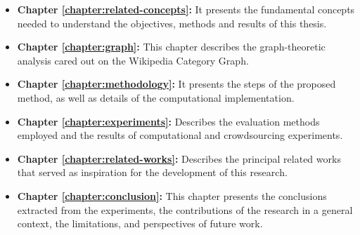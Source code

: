 \begin{itemize}
\item\textbf {Chapter \ref{chapter:related-concepts}:} It presents the fundamental concepts needed to understand the objectives, methods and results of this thesis.

\item \textbf {Chapter \ref{chapter:graph}:} This chapter describes the graph-theoretic analysis cared out on the Wikipedia Category Graph.

\item \textbf {Chapter \ref{chapter:methodology}:} It presents the steps of the proposed method, as well as details of the computational implementation.

\item \textbf {Chapter \ref{chapter:experiments}:} Describes the evaluation methods employed and the results of computational and crowdsourcing experiments.

\item \textbf {Chapter \ref{chapter:related-works}:} Describes the principal related works that served as inspiration for the development of this research.

\item \textbf {Chapter \ref{chapter:conclusion}:} This chapter presents the conclusions extracted from the experiments, the contributions of the research in a general context, the limitations, and perspectives of future work.

\end{itemize}
